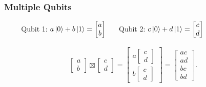 \documentclass{beamer}
\theoremstyle{definition}
\begin{document}
\begin{frame}
\frametitle{Multiple Qubits}
\pause
$\hspace{1cm}$Qubit 1: $a\ket{0} + b\ket{1} = \begin{bmatrix} a\\b \end{bmatrix} \hspace{0.5cm}$ Qubit 2: $c\ket{0} + d\ket{1} = \begin{bmatrix}
c\\d
\end{bmatrix}$




\pause
\begin{align*}
\begin{bmatrix}
a\\b
\end{bmatrix}
\boxtimes
\begin{bmatrix}
c\\d
\end{bmatrix} = \begin{bmatrix}
a\begin{bmatrix}
c\\d
\end{bmatrix}\\
b\begin{bmatrix}
c\\d
\end{bmatrix}
\end{bmatrix}
=
\begin{bmatrix}
ac\\ad\\bc\\bd
\end{bmatrix}.
\end{align*}
\end{frame}
\end{document}
